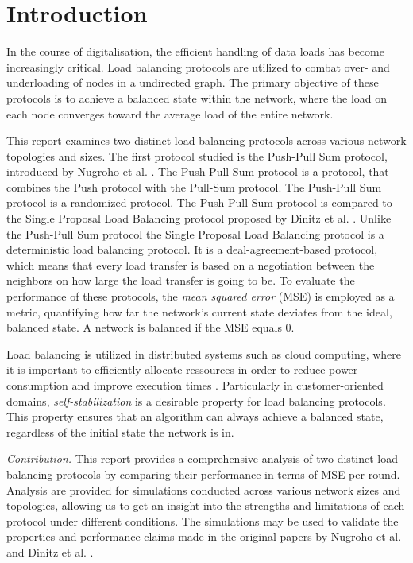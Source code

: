\chapter{Introduction}\label{chap:introduction}
In the course of digitalisation, the efficient handling of data loads has become increasingly critical. Load balancing protocols are utilized to combat over- and underloading of nodes in a undirected graph. The primary objective of these protocols is to achieve a balanced state within the network, where the load on each node converges toward the average load of the entire network. 

This report examines two distinct load balancing protocols across various network topologies and sizes. The first protocol studied is the Push-Pull Sum protocol, introduced by Nugroho et al. \cite{nugroho2023PushPullSumDataAg}. The Push-Pull Sum protocol is a protocol, that combines the Push protocol \cite{kempe2003gossipbasedComp} with the Pull-Sum protocol. The Push-Pull Sum protocol is a randomized protocol. The Push-Pull Sum protocol is compared to the Single Proposal Load Balancing protocol proposed by Dinitz et al. \cite{dinitz2022localDealAgreementloadBalancing}. Unlike the Push-Pull Sum protocol the Single Proposal Load Balancing protocol is a deterministic load balancing protocol. It is a deal-agreement-based protocol, which means that every load transfer is based on a negotiation between the neighbors on how large the load transfer is going to be. To evaluate the performance of these protocols, the \textit{mean squared error} (MSE) is employed as a metric, quantifying how far the network's current state deviates from the ideal, balanced state. A network is balanced if the MSE equals 0.

Load balancing is utilized in distributed systems such as cloud computing, where it is important to efficiently allocate ressources in order to reduce power consumption and improve execution times \cite{Aghdashi2022NovelDynamicLoadBalancing}. Particularly in customer-oriented domains, \textit{self-stabilization} is a desirable property for load balancing protocols. This property ensures that an algorithm can always achieve a balanced state, regardless of the initial state the network is in.

\textit{Contribution.} This report provides a comprehensive analysis of two distinct load balancing protocols by comparing their performance in terms of MSE per round. Analysis are provided for simulations conducted across various network sizes and topologies, allowing us to get an insight into the strengths and limitations of each protocol under different conditions. The simulations may be used to validate the properties and performance claims made in the original papers by Nugroho et al. \cite{nugroho2023PushPullSumDataAg} and Dinitz et al. \cite{dinitz2022localDealAgreementloadBalancing}.

